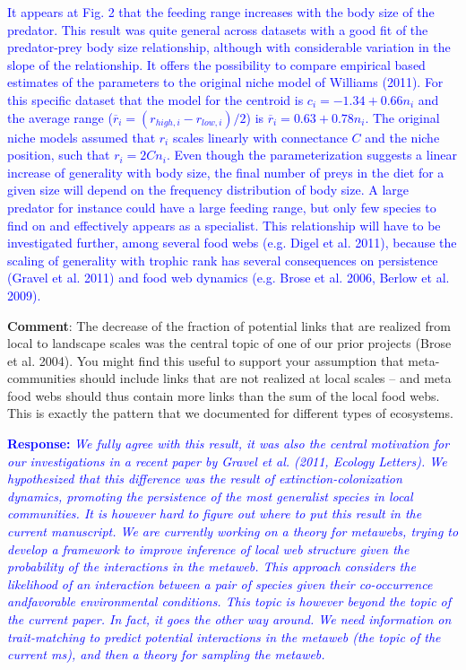 \documentclass [12pt,onecolumn,twoside,openright]{report}
\begin{document}
\begin{onehalfspacing}
\textcolor{blue}{It appears at Fig. 2 that the feeding range increases with the body size of the predator. This result was quite general across datasets with a good fit of the predator-prey body size relationship, although with considerable variation in the slope of the relationship. It offers the possibility to compare empirical based estimates of the parameters to the original niche model of Williams (2011). For this specific dataset that the model for the centroid is $c_i = -1.34 + 0.66n_i$ and the average range ($\overline{r}_i=(r_{high,i} - r_{low,i})/2$) is $\overline{r}_i = 0.63 + 0.78n_i$. The original niche models assumed that $r_i$ scales linearly with connectance $C$ and the niche position, such that $r_i = 2Cn_i$. Even though the parameterization suggests a linear increase of generality with body size, the final number of preys in the diet for a given size will depend on the frequency distribution of body size. A large predator for instance could have a large feeding range, but only few species to find on and effectively appears as a specialist. This relationship will have to be investigated further, among several food webs (e.g. Digel et al. 2011), because the scaling of generality with trophic rank has several consequences on persistence (Gravel et al. 2011) and food web dynamics (e.g. Brose et al. 2006, Berlow et al. 2009).}

\medskip \textbf{Comment}: The decrease of the fraction of
potential links that are realized from local to landscape scales was the central
topic of one of our prior projects (Brose et al. 2004). You might find this
useful to support your assumption that meta-communities should include links
that are not realized at local scales – and meta food webs should thus contain
more links than the sum of the local food webs. This is exactly the pattern that
we documented for different types of ecosystems.

\medskip \textcolor{blue}{\textbf{Response:}} \textit{\textcolor{blue}{We fully agree with this result, it was also the central motivation for our investigations in a recent paper by Gravel et al. (2011, Ecology Letters). We hypothesized that this difference was the result of extinction-colonization dynamics, promoting the persistence of the most generalist species in local communities. It is however hard to figure out where to put this result in the current manuscript. We are currently working on a theory for metawebs, trying to develop a framework to improve inference of local web structure given the probability of the interactions in the metaweb. This approach considers the likelihood of an interaction between a pair of species given their co-occurrence andfavorable environmental conditions. This topic is however beyond the topic of the current paper. In fact, it goes the other way around. We need information on trait-matching to predict potential interactions in the metaweb (the topic of the current ms), and then a theory for sampling the metaweb.}}


\end{onehalfspacing}
\end{document}

